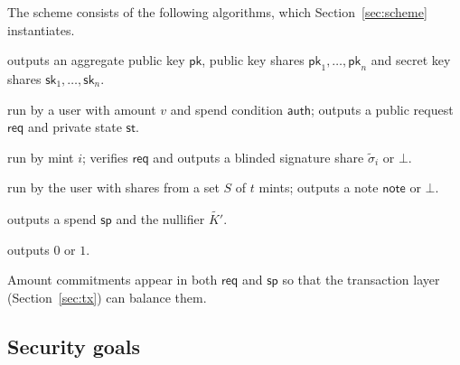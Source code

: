 \documentclass[10pt,a5paper]{article}
\newcommand{\K}[1]{#1}                      %
\newcommand{\Go}[1]{#1}                     %
\newcommand{\Gt}[1]{\tilde{#1}}             %
\newcommand{\K}[1]{{\color{ScalarCol}#1}}   %
\newcommand{\Go}[1]{{\color{GoneCol}#1}}    %
\newcommand{\Gt}[1]{{\color{GtwoCol}#1}}    %
\newcommand{\auth}{\mathsf{auth}}
\begin{document}
The scheme consists of the following algorithms, which
Section~\ref{sec:scheme} instantiates.
\begin{description}[nosep,leftmargin=1.2em]
\item[$\mathsf{KeyGen}(t,n)$] outputs an aggregate public key $\mathsf{pk}$,
  public key shares $\mathsf{pk}_1,\dots,\mathsf{pk}_n$ and secret key shares
  $\mathsf{sk}_1,\dots,\mathsf{sk}_n$.
\item[$\mathsf{Request}(\K{v},\auth)$] run by a user with amount $\K{v}$ and
  spend condition $\auth$; outputs a public request $\mathsf{req}$ and private
  state $\mathsf{st}$.
\item[$\mathsf{Sign}(\mathsf{sk}_i,\mathsf{req})$] run by mint $i$; verifies
  $\mathsf{req}$ and outputs a blinded signature share $\Go{\widetilde{\sigma}_i}$
  or $\bot$.
\item[$\mathsf{Finalize}(\mathsf{st},\{\Go{\widetilde{\sigma}_i}\}_{i\in S})$]
  run by the user with shares from a set $S$ of $t$ mints; outputs a note
  $\mathsf{note}$ or $\bot$.
\item[$\mathsf{Spend}(\mathsf{note})$] outputs a spend $\mathsf{sp}$ and the
  nullifier $\Gt{K'}$.
\item[$\mathsf{Verify}(\mathsf{pk},\mathsf{sp},\auth)$] outputs $0$ or $1$.
\end{description}
Amount commitments appear in both $\mathsf{req}$ and $\mathsf{sp}$ so that the
transaction layer (Section~\ref{sec:tx}) can balance them.

\subsection{Security goals}
\end{document}
